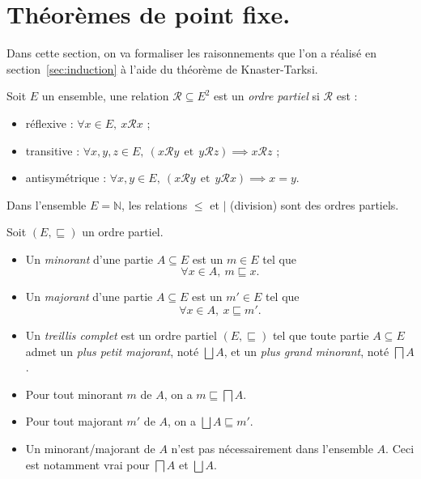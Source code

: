 \documentclass[../main]{subfiles}
\begin{document}
  \chapter{Théorèmes de point fixe.} \label{thprog-chap02}

  \minitoc


  Dans cette section, on va formaliser les raisonnements que l'on a réalisé en section~\ref{sec:induction} à l'aide du théorème de Knaster-Tarksi.

  \begin{defn}
    Soit $E$ un ensemble, une relation $\mathcal{R} \subseteq E^2$ est un \textit{ordre partiel} si $\mathcal{R}$ est :
    \newcommand{\relR}{\ensuremath{\mathrel{\mathcal{R}}}}
    \begin{itemize}
      \item réflexive : $\forall x \in E, \ x \relR x $ ;
      \item transitive : $\forall x,y,z \in E, \ (x \relR y \ \ \text{et}\ \ y \relR z) \implies x \relR z  $ ;
      \item antisymétrique : $\forall x,y \in E, \ (x \relR y \ \ \text{et}\ \ y \relR x) \implies x = y $.
    \end{itemize}
  \end{defn}

  \begin{exm}
    Dans l'ensemble $E = \mathds{N}$, les relations $\le$ et $\mid$ (division) sont des ordres partiels.
  \end{exm}

  \begin{defn}
    Soit $(E, \sqsubseteq)$ un ordre partiel.
    \begin{itemize}
      \item Un \textit{minorant} d'une partie $A \subseteq E$ est un $m \in E$ tel que  \[
      \forall x \in A,\  m \sqsubseteq x
      .\]
      \item Un \textit{majorant} d'une partie $A \subseteq E$ est un $m' \in E$ tel que  \[
      \forall x \in A, \ x \sqsubseteq m'
      .\]
      \item Un \textit{treillis complet} est un ordre partiel $(E, \sqsubseteq)$ tel que toute partie $A \subseteq E$ admet un \textit{plus petit majorant}, noté $\bigsqcup A$, et un \textit{plus grand minorant}, noté $\bigsqcap A$.
    \end{itemize}
  \end{defn}

  \begin{rmk}
    \begin{itemize}
      \item Pour tout minorant $m$ de $A$, on a $m \sqsubseteq \bigsqcap A$.
      \item Pour tout majorant $m'$ de $A$, on a $\bigsqcup A \sqsubseteq m'$.
      \item Un minorant/majorant de $A$ n'est pas nécessairement dans l'ensemble $A$. Ceci est notamment vrai pour $\bigsqcap A$ et $\bigsqcup A$.
    \end{itemize}
  \end{rmk}
\end{document}
